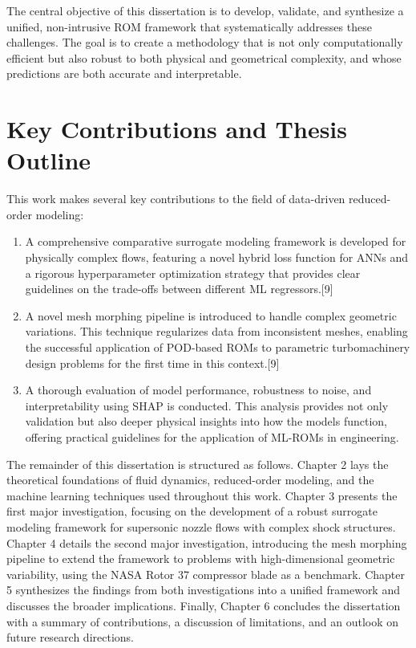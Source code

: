 \documentclass[12pt, a4paper]{report}
\begin{document}
The central objective of this dissertation is to develop, validate, and synthesize a unified, non-intrusive ROM framework that systematically addresses these challenges. The goal is to create a methodology that is not only computationally efficient but also robust to both physical and geometrical complexity, and whose predictions are both accurate and interpretable.

\section{Key Contributions and Thesis Outline}
This work makes several key contributions to the field of data-driven reduced-order modeling:
\begin{enumerate}
    \item A comprehensive comparative surrogate modeling framework is developed for physically complex flows, featuring a novel hybrid loss function for ANNs and a rigorous hyperparameter optimization strategy that provides clear guidelines on the trade-offs between different ML regressors.[9]
    \item A novel mesh morphing pipeline is introduced to handle complex geometric variations. This technique regularizes data from inconsistent meshes, enabling the successful application of POD-based ROMs to parametric turbomachinery design problems for the first time in this context.[9]
    \item A thorough evaluation of model performance, robustness to noise, and interpretability using SHAP is conducted. This analysis provides not only validation but also deeper physical insights into how the models function, offering practical guidelines for the application of ML-ROMs in engineering.
\end{enumerate}

The remainder of this dissertation is structured as follows. Chapter 2 lays the theoretical foundations of fluid dynamics, reduced-order modeling, and the machine learning techniques used throughout this work. Chapter 3 presents the first major investigation, focusing on the development of a robust surrogate modeling framework for supersonic nozzle flows with complex shock structures. Chapter 4 details the second major investigation, introducing the mesh morphing pipeline to extend the framework to problems with high-dimensional geometric variability, using the NASA Rotor 37 compressor blade as a benchmark. Chapter 5 synthesizes the findings from both investigations into a unified framework and discusses the broader implications. Finally, Chapter 6 concludes the dissertation with a summary of contributions, a discussion of limitations, and an outlook on future research directions.
\end{document}
